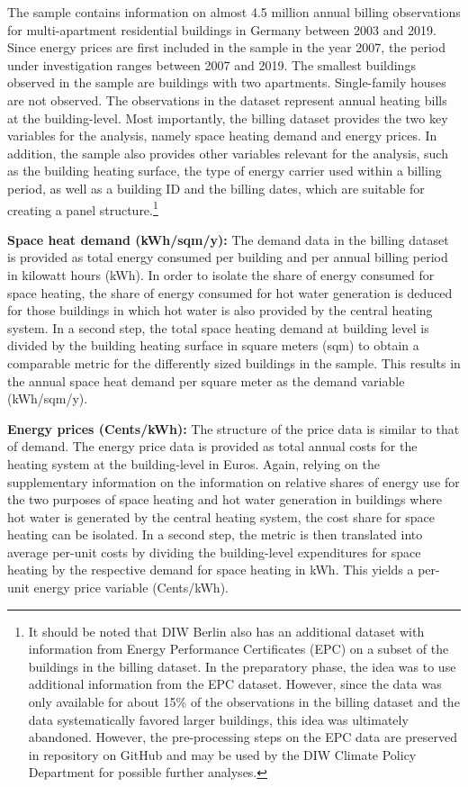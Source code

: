 \documentclass[12pt,twoside]{reedthesis}
\begin{document}
The sample contains information on almost 4.5 million annual billing observations for multi-apartment residential buildings in Germany between 2003 and 2019. Since energy prices are first included in the sample in the year 2007, the period under investigation ranges between 2007 and 2019. The smallest buildings observed in the sample are buildings with two apartments. Single-family houses are not observed. The observations in the dataset represent annual heating bills at the building-level. Most importantly, the billing dataset provides the two key variables for the analysis, namely space heating demand and energy prices. In addition, the sample also provides other variables relevant for the analysis, such as the building heating surface, the type of energy carrier used within a billing period, as well as a building ID and the billing dates, which are suitable for creating a panel structure.\footnote{It should be noted that DIW Berlin also has an additional dataset with information from Energy Performance Certificates (EPC) on a subset of the buildings in the billing dataset. In the preparatory phase, the idea was to use additional information from the EPC dataset. However, since the data was only available for about 15\% of the observations in the billing dataset and the data systematically favored larger buildings, this idea was ultimately abandoned. However, the pre-processing steps on the EPC data are preserved in repository on GitHub and may be used by the DIW Climate Policy Department for possible further analyses.}

\textbf{Space heat demand (kWh/sqm/y):} The demand data in the billing dataset is provided as total energy consumed per building and per annual billing period in kilowatt hours (kWh). In order to isolate the share of energy consumed for space heating, the share of energy consumed for hot water generation is deduced for those buildings in which hot water is also provided by the central heating system. In a second step, the total space heating demand at building level is divided by the building heating surface in square meters (sqm) to obtain a comparable metric for the differently sized buildings in the sample. This results in the annual space heat demand per square meter as the demand variable (kWh/sqm/y).

\textbf{Energy prices (Cents/kWh):} The structure of the price data is similar to that of demand. The energy price data is provided as total annual costs for the heating system at the building-level in Euros. Again, relying on the supplementary information on the information on relative shares of energy use for the two purposes of space heating and hot water generation in buildings where hot water is generated by the central heating system, the cost share for space heating can be isolated. In a second step, the metric is then translated into average per-unit costs by dividing the building-level expenditures for space heating by the respective demand for space heating in kWh. This yields a per-unit energy price variable (Cents/kWh).
\end{document}

